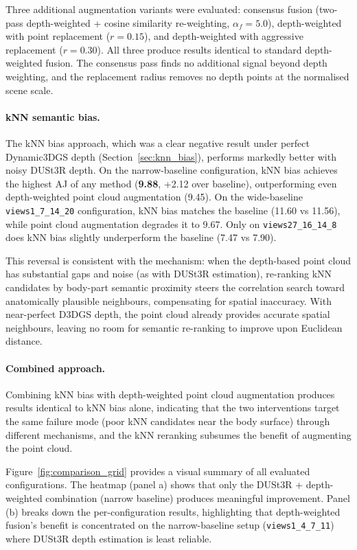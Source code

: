 \documentclass[12pt, a4paper, oneside]{report}
\begin{document}
Three additional augmentation variants were evaluated: consensus fusion (two-pass depth-weighted + cosine similarity re-weighting, $\alpha_f = 5.0$), depth-weighted with point replacement ($r = 0.15$), and depth-weighted with aggressive replacement ($r = 0.30$). All three produce results identical to standard depth-weighted fusion. The consensus pass finds no additional signal beyond depth weighting, and the replacement radius removes no depth points at the normalised scene scale.

\paragraph{kNN semantic bias.} The kNN bias approach, which was a clear negative result under perfect Dynamic3DGS depth (Section~\ref{sec:knn_bias}), performs markedly better with noisy DUSt3R depth. On the narrow-baseline configuration, kNN bias achieves the highest AJ of any method (\textbf{9.88}, +2.12 over baseline), outperforming even depth-weighted point cloud augmentation (9.45). On the wide-baseline \texttt{views1\_7\_14\_20} configuration, kNN bias matches the baseline (11.60 vs 11.56), while point cloud augmentation degrades it to 9.67. Only on \texttt{views27\_16\_14\_8} does kNN bias slightly underperform the baseline (7.47 vs 7.90).

This reversal is consistent with the mechanism: when the depth-based point cloud has substantial gaps and noise (as with DUSt3R estimation), re-ranking kNN candidates by body-part semantic proximity steers the correlation search toward anatomically plausible neighbours, compensating for spatial inaccuracy. With near-perfect D3DGS depth, the point cloud already provides accurate spatial neighbours, leaving no room for semantic re-ranking to improve upon Euclidean distance.

\paragraph{Combined approach.} Combining kNN bias with depth-weighted point cloud augmentation produces results identical to kNN bias alone, indicating that the two interventions target the same failure mode (poor kNN candidates near the body surface) through different mechanisms, and the kNN reranking subsumes the benefit of augmenting the point cloud.

Figure~\ref{fig:comparison_grid} provides a visual summary of all evaluated configurations. The heatmap (panel a) shows that only the DUSt3R + depth-weighted combination (narrow baseline) produces meaningful improvement. Panel (b) breaks down the per-configuration results, highlighting that depth-weighted fusion's benefit is concentrated on the narrow-baseline setup (\texttt{views1\_4\_7\_11}) where DUSt3R depth estimation is least reliable.
\end{document}

